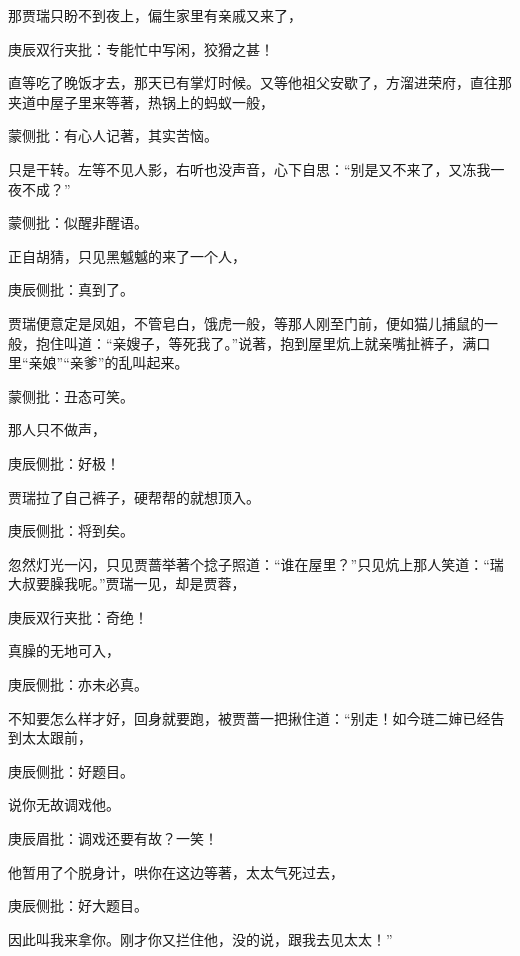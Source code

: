 \begin{parag}
    那贾瑞只盼不到夜上，偏生家里有亲戚又来了，\begin{note}庚辰双行夹批：专能忙中写闲，狡猾之甚！\end{note}直等吃了晚饭才去，那天已有掌灯时候。又等他祖父安歇了，方溜进荣府，直往那夹道中屋子里来等著，热锅上的蚂蚁一般，\begin{note}蒙侧批：有心人记著，其实苦恼。\end{note}只是干转。左等不见人影，右听也没声音，心下自思：“别是又不来了，又冻我一夜不成？”\begin{note}蒙侧批：似醒非醒语。\end{note}正自胡猜，只见黑魆魆的来了一个人，\begin{note}庚辰侧批：真到了。\end{note}贾瑞便意定是凤姐，不管皂白，饿虎一般，等那人刚至门前，便如猫儿捕鼠的一般，抱住叫道：“亲嫂子，等死我了。”说著，抱到屋里炕上就亲嘴扯裤子，满口里“亲娘”“亲爹”的乱叫起来。\begin{note}蒙侧批：丑态可笑。\end{note}那人只不做声，\begin{note}庚辰侧批：好极！\end{note}贾瑞拉了自己裤子，硬帮帮的就想顶入。\begin{note}庚辰侧批：将到矣。\end{note}忽然灯光一闪，只见贾蔷举著个捻子照道：“谁在屋里？”只见炕上那人笑道：“瑞大叔要臊我呢。”贾瑞一见，却是贾蓉，\begin{note}庚辰双行夹批：奇绝！\end{note}真臊的无地可入，\begin{note}庚辰侧批：亦未必真。\end{note}不知要怎么样才好，回身就要跑，被贾蔷一把揪住道：“别走！如今琏二婶已经告到太太跟前，\begin{note}庚辰侧批：好题目。\end{note}说你无故调戏他。\begin{note}庚辰眉批：调戏还要有故？一笑！\end{note}他暂用了个脱身计，哄你在这边等著，太太气死过去，\begin{note}庚辰侧批：好大题目。\end{note}因此叫我来拿你。刚才你又拦住他，没的说，跟我去见太太！”
\end{parag}


